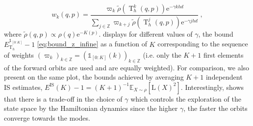 \documentclass{article}
\def\transfo{\operatorname{T}}
\def\PE{\mathbb{E}}
\def\eqsp{\,}
\def\eqsp{\;}
\newcommand{\1}{\mathds{1}}
\newcommand{\indi}[1]{\1_{#1}}
\def\proposal{\rho}
\def\zset{\mathbb{Z}}
\def\rme{\mathrm{e}}
\def\likelihood{\mathrm{L}}
\begin{document}
$$
w_{k}(q,p) = \frac{ \varpi_k \tilde \rho(\transfo^k_h(q,p)) \rme^{-\gamma k h d} }{
    \sum_{j \in\zset}\varpi_{k+j}  \tilde \rho(\transfo^j_h(q,p)) \rme^{-\gamma j h d} }\eqsp,
$$
where $\tilde \rho(q,p) \propto \rho(q) \rme^{-K(p)}$.
 displays for different values of $\gamma$, the bound  $E^{\indi{[0:K]}}_{\transfo_h}-1$ \eqref{eq:bound_z_infine} as a function of $K$ corresponding to the sequence of weights $(\varpi_k)_{k\in\zset} =  (\indi{[0:K]}(k))_{k\in\zset}$ (i.e. only the $K+1$ first elements of the forward orbits are used and are equally weighted). 
For comparison, we also present on the same plot, the bounds achieved  by averaging $K+1$ independent IS estimates, $E^{\operatorname{IS}}(K) -1  = (K+1)^{-1} \PE_{X \sim \proposal}[ \likelihood(X)^2]$. Interestingly,  shows that there is a trade-off in the choice of $\gamma$ which controls the exploration of the state space by the Hamiltonian dynamics since the higher $\gamma$, the faster the orbits converge towards the modes.
\end{document}
